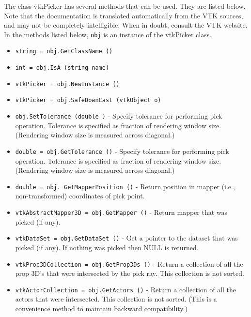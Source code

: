 The class vtkPicker has several methods that can be used.
  They are listed below.
Note that the documentation is translated automatically from the VTK sources,
and may not be completely intelligible.  When in doubt, consult the VTK website.
In the methods listed below, \verb|obj| is an instance of the vtkPicker class.
\begin{itemize}
\item  \verb|string = obj.GetClassName ()|

\item  \verb|int = obj.IsA (string name)|

\item  \verb|vtkPicker = obj.NewInstance ()|

\item  \verb|vtkPicker = obj.SafeDownCast (vtkObject o)|

\item  \verb|obj.SetTolerance (double )| -  Specify tolerance for performing pick operation. Tolerance is specified
 as fraction of rendering window size. (Rendering window size is measured
 across diagonal.)

\item  \verb|double = obj.GetTolerance ()| -  Specify tolerance for performing pick operation. Tolerance is specified
 as fraction of rendering window size. (Rendering window size is measured
 across diagonal.)

\item  \verb|double = obj. GetMapperPosition ()| -  Return position in mapper (i.e., non-transformed) coordinates of 
 pick point.

\item  \verb|vtkAbstractMapper3D = obj.GetMapper ()| -  Return mapper that was picked (if any).

\item  \verb|vtkDataSet = obj.GetDataSet ()| -  Get a pointer to the dataset that was picked (if any). If nothing 
 was picked then NULL is returned.

\item  \verb|vtkProp3DCollection = obj.GetProp3Ds ()| -  Return a collection of all the prop 3D's that were intersected
 by the pick ray. This collection is not sorted.

\item  \verb|vtkActorCollection = obj.GetActors ()| -  Return a collection of all the actors that were intersected.
 This collection is not sorted. (This is a convenience method
 to maintain backward compatibility.)


\end{itemize}
